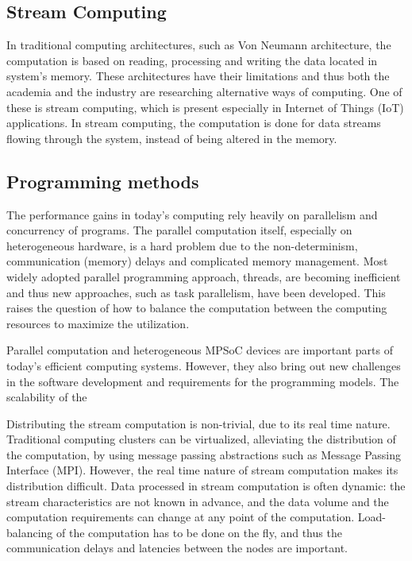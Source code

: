 \subsection{Stream Computing}
In traditional computing architectures, such as Von Neumann architecture, the computation is based on reading, processing and writing the data located in system's memory. These architectures have their limitations and thus both the academia and the industry are researching alternative ways of computing. One of these is stream computing, which is present especially in Internet of Things (IoT) applications. In stream computing, the computation is done for data streams flowing through the system, instead of being altered in the memory.

\subsection{Programming methods}
The performance gains in today's computing rely heavily on parallelism and concurrency of programs. The parallel computation itself, especially on heterogeneous hardware, is a hard problem due to the non-determinism, communication (memory) delays and complicated memory management. Most widely adopted  parallel programming approach, threads, are becoming inefficient and thus new approaches, such as task parallelism, have been developed. This raises the question of how to balance the computation between the computing resources to maximize the utilization.

Parallel computation and heterogeneous MPSoC devices are important parts of today's efficient computing systems. However, they also bring out new challenges in the software development and requirements for the programming models. The scalability of the

Distributing the stream computation is non-trivial, due to its real time nature. Traditional computing clusters can be virtualized, alleviating the distribution of the computation, by using message passing abstractions such as Message Passing Interface (MPI). However, the real time nature of stream computation makes its distribution difficult. Data processed in stream computation is often dynamic: the stream characteristics are not known in advance, and the data volume and the computation requirements can change at any point of the computation. Load-balancing of the computation has to be done on the fly, and thus the communication delays and latencies between the nodes are important.




